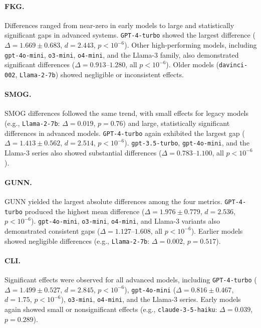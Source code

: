 \paragraph{FKG.}
Differences ranged from near-zero in early models to large and statistically significant gaps in advanced systems.  
\texttt{GPT-4-turbo} showed the largest difference ($\Delta = 1.669 \pm 0.683$, $d = 2.443$, $p < 10^{-6}$).  
Other high-performing models, including \texttt{gpt-4o-mini}, \texttt{o3-mini}, \texttt{o4-mini}, and the Llama-3 family, also demonstrated significant differences ($\Delta = 0.913$--$1.280$, all $p < 10^{-6}$).  
Older models (\texttt{davinci-002}, \texttt{Llama-2-7b}) showed negligible or inconsistent effects.

\paragraph{SMOG.}
SMOG differences followed the same trend, with small effects for legacy models (e.g., \texttt{Llama-2-7b}: $\Delta = 0.019$, $p = 0.76$) and large, statistically significant differences in advanced models.  
\texttt{GPT-4-turbo} again exhibited the largest gap ($\Delta = 1.413 \pm 0.562$, $d = 2.514$, $p < 10^{-6}$).  
\texttt{gpt-3.5-turbo}, \texttt{gpt-4o-mini}, and the Llama-3 series also showed substantial differences ($\Delta = 0.783$--$1.100$, all $p < 10^{-6}$).

\paragraph{GUNN.}
GUNN yielded the largest absolute differences among the four metrics.  
\texttt{GPT-4-turbo} produced the highest mean difference ($\Delta = 1.976 \pm 0.779$, $d = 2.536$, $p < 10^{-6}$).  
\texttt{gpt-4o-mini}, \texttt{o3-mini}, \texttt{o4-mini}, and Llama-3 variants also demonstrated consistent gaps ($\Delta = 1.127$--$1.608$, all $p < 10^{-6}$).  
Earlier models showed negligible differences (e.g., \texttt{Llama-2-7b}: $\Delta = 0.002$, $p = 0.517$).

\paragraph{CLI.}
Significant effects were observed for all advanced models, including \texttt{GPT-4-turbo} ($\Delta = 1.499 \pm 0.527$, $d = 2.845$, $p < 10^{-6}$), \texttt{gpt-4o-mini} ($\Delta = 0.816 \pm 0.467$, $d = 1.75$, $p < 10^{-6}$), \texttt{o3-mini}, \texttt{o4-mini}, and the Llama-3 series.  
Early models again showed small or nonsignificant effects (e.g., \texttt{claude-3-5-haiku}: $\Delta = 0.039$, $p = 0.289$).

